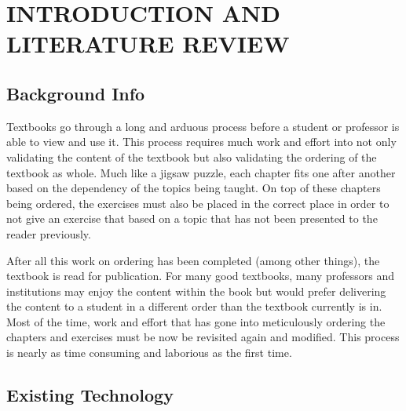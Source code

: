 %
%
%
%


\pagestyle{plain} %

\chapter{INTRODUCTION AND LITERATURE REVIEW}

\section{Background Info}

Textbooks go through a long and arduous process before a student or professor is able to view and use it. This process requires much work and effort into not only validating the content of the textbook but also validating the ordering of the textbook as whole. Much like a jigsaw puzzle, each chapter fits one after another based on the dependency of the topics being taught. On top of these chapters being ordered, the exercises must also be placed in the correct place in order to not give an exercise that based on a topic that has not been presented to the reader previously.

After all this work on ordering has been completed (among other things), the textbook is read for publication. For many good textbooks, many professors and institutions may enjoy the content within the book but would prefer delivering the content to a student in a different order than the textbook currently is in. Most of the time, work and effort that has gone into meticulously ordering the chapters and exercises must be now be revisited again and modified. This process is nearly as time consuming and laborious as the first time.

\section{Existing Technology}

